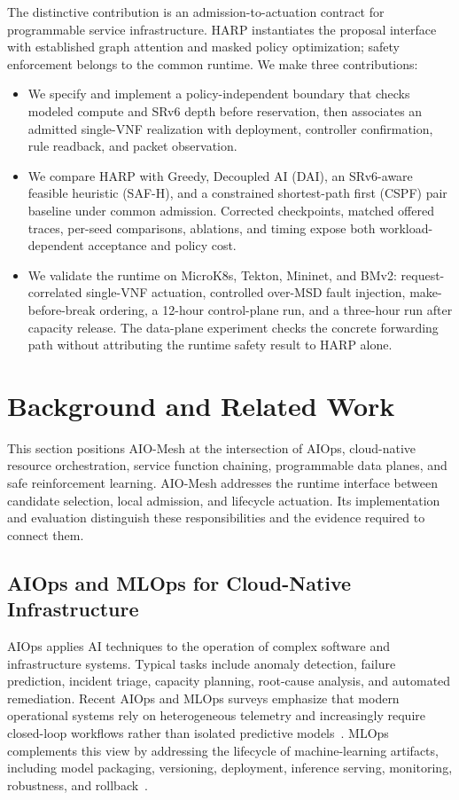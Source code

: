 \documentclass[final,5p]{elsarticle}
\newcommand{\rev}[1]{\textcolor{revisiongreen}{#1}}
\let\newrev\rev
\begin{document}
\newrev{The distinctive contribution is an admission-to-actuation contract for programmable service infrastructure. HARP instantiates the proposal interface with established graph attention and masked policy optimization; safety enforcement belongs to the common runtime. We make three contributions:}
\begin{itemize}
\item \newrev{We specify and implement a policy-independent boundary that checks modeled compute and SRv6 depth before reservation, then associates an admitted single-VNF realization with deployment, controller confirmation, rule readback, and packet observation.}
\item \newrev{We compare HARP with Greedy, Decoupled AI (DAI), an SRv6-aware feasible heuristic (SAF-H), and a constrained shortest-path first (CSPF) pair baseline under common admission. Corrected checkpoints, matched offered traces, per-seed comparisons, ablations, and timing expose both workload-dependent acceptance and policy cost.}
\item \newrev{We validate the runtime on MicroK8s, Tekton, Mininet, and BMv2: request-correlated single-VNF actuation, controlled over-MSD fault injection, make-before-break ordering, a 12-hour control-plane run, and a three-hour run after capacity release. The data-plane experiment checks the concrete forwarding path without attributing the runtime safety result to HARP alone.}
\end{itemize}

\section{Background and Related Work}
\label{sec:related}

This section positions AIO-Mesh at the intersection of AIOps, cloud-native resource orchestration, service function chaining, programmable data planes, and safe reinforcement learning. \newrev{AIO-Mesh addresses the runtime interface between candidate selection, local admission, and lifecycle actuation. Its implementation and evaluation distinguish these responsibilities and the evidence required to connect them.}

\subsection{AIOps and MLOps for Cloud-Native Infrastructure}
\label{subsec:related_aiops}

AIOps applies AI techniques to the operation of complex software and infrastructure systems. Typical tasks include anomaly detection, failure prediction, incident triage, capacity planning, root-cause analysis, and automated remediation. Recent AIOps and MLOps surveys emphasize that modern operational systems rely on heterogeneous telemetry and increasingly require closed-loop workflows rather than isolated predictive models~\cite{diazdearcaya2024joint,zhang2025aiopsllm}. MLOps complements this view by addressing the lifecycle of machine-learning artifacts, including model packaging, versioning, deployment, inference serving, monitoring, robustness, and rollback~\cite{kreuzberger2023mlops,eken2025mlops,bayram2025trustworthy}.
\end{document}
